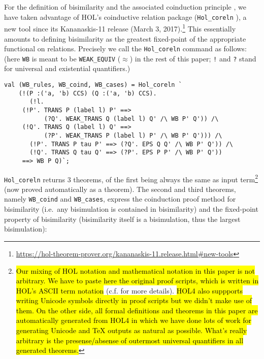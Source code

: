 For the definition of bisimilarity and the associated coinduction
principle \cite{sangiorgi2011advanced}, we have taken
advantage of HOL's coinductive relation package (\texttt{Hol_coreln} \cite{holdesc}),
a new tool since its Kananaskis-11 release (March 3,
2017).\footnote{\url{https://hol-theorem-prover.org/kananaskis-11.release.html\#new-tools}}
This essentially amounts to defining bisimilarity as the greatest
fixed-point of the appropriate functional on relations. 
Precisely we call 
the \texttt{Hol_coreln}
command as follows: (here \texttt{WB} is meant to be
\texttt{WEAK_EQUIV} ($\approx$) in the rest of this paper;
{\tt !} and {\tt ?} stand for universal and
existential quantifiers.)
\begin{lstlisting}
val (WB_rules, WB_coind, WB_cases) = Hol_coreln `
    (!(P :('a, 'b) CCS) (Q :('a, 'b) CCS).
       (!l.
	 (!P'. TRANS P (label l) P' ==>
	       (?Q'. WEAK_TRANS Q (label l) Q' /\ WB P' Q')) /\
	 (!Q'. TRANS Q (label l) Q' ==>
	       (?P'. WEAK_TRANS P (label l) P' /\ WB P' Q'))) /\
       (!P'. TRANS P tau P' ==> (?Q'. EPS Q Q' /\ WB P' Q')) /\
       (!Q'. TRANS Q tau Q' ==> (?P'. EPS P P' /\ WB P' Q'))
     ==> WB P Q)`;
\end{lstlisting}
\texttt{Hol_coreln} returns 3 theorems, of the first being always the
same as input term\footnote{\hl{Our mixing of HOL notation and mathematical
  notation in this paper is not arbitrary. We have to paste here the
  original proof scripts, which is written in HOL's ASCII term
  notation} (c.f. \cite{holdesc} for more details). \hl{HOL4 also suppports writing Unicode symbols directly in
  proof scripts but we didn't make use of them. On the other side, all formal definitions and
  theorems in this paper are automatically generated from HOL4 in
  which we have done lots of work for generating
  Unicode and TeX outputs as natural as possible. What's really
  arbitrary is the presense/absense of outermost universal
  quantifiers in all generated theorems.}} (now proved automatically as a theorem).
The second and third theorems, namely \texttt{WB_coind} and \texttt{WB_cases},
express the coinduction proof method for bisimilarity 
(i.e.~any bisimulation is contained in bisimilarity)
and the fixed-point property of bisimilarity
(bisimilarity itself is a bisimulation, thus the largest
bisimulation):
